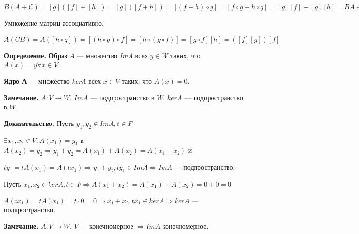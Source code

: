 \documentclass[a4paper]{article}
\begin{document}
    \begin{hproof}
        $B(A+C) = [g]([f]+[h]) = [g]([f+h]) = [(f+h) \circ g] = [f \circ g + h \circ g] = [g][f] + [g][h] = BA+BC$
    \end{hproof}


    \begin{htheorem}
        Умножение матриц ассоциативно.
    \end{htheorem}

    \begin{hproof}
        $A(CB) = A([h \circ g]) = [(h \circ g) \circ f] = [h \circ (g \circ f)] = [g \circ f][h] = ([f][g])[f]$
    \end{hproof}

    \newpage \begin{center}
                 \begin{Large}
                 \end{Large}
    \end{center}

    \textbf{Определение. Образ} $A$ --- множество \textit{ImA} всех $y \in W$ таких, что $A(x) = y \forall x \in V$.

    \textbf{Ядро А} --- множество \textit{kerA} всех $x \in V$ таких, что $A(x) = 0$.

    \begin{htheorem}
        \textbf{Замечание.} $A: V \rightarrow W$. $ImA$ --- подпространство в $W$, $kerA$ --- подпространство в $W$.
    \end{htheorem}

    \begin{hproof}
        \textbf{Доказательство.} Пусть $y_1, y_2 \in ImA, t \in F$

        $\exists x_1, x_2 \in V: A(x_1) = y_1$ и $A(x_2) = y_2 \Rightarrow y_1+y_2 = A(x_1)+A(x_2) = A(x_1+x_2)$ и

        $ty_1 = tA(x_1) = A(tx_1) \Rightarrow y_1+y_2, ty_1 \in ImA \Rightarrow ImA$ --- подпространство.

        Пусть $x_1, x_2 \in kerA, t \in F \Rightarrow A(x_1 + x_2) = A(x_1) + A(x_2) = 0+0 = 0$

        $A(tx_1) = tA(x_1) = t \cdot 0 = 0 \Rightarrow x_1 + x_2, tx_1 \in kerA \Rightarrow kerA$ --- подпространство.
    \end{hproof}

    \begin{htheorem}
        \textbf{Замечание.} $A: V \rightarrow W$. $V$ --- конечномерное $\Rightarrow ImA$ конечномерное.
    \end{htheorem}
\end{document}
